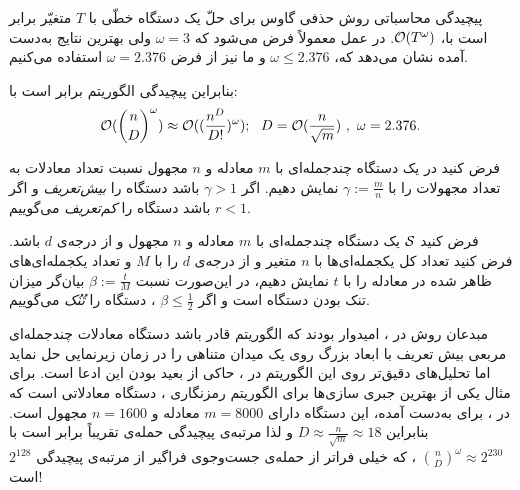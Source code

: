  \begin{remark}
 	پیچیدگی محاسباتی روش حذفی گاوس برای حلّ یک دستگاه خطّی با 
 	$T$
 	متغیّر برابر است با،
 	${\mathcal O}(T^{\omega})$.
 	در عمل معمولاً فرض می‌شود که 
 	$\omega = 3$
 	ولی بهترین نتایج به‌دست  آمده نشان می‌دهد که،
 	$\omega \leq 2.376$
 	و ما نیز از فرض 
 	$\omega = 2.376$
 	استفاده می‌کنیم. 
 \end{remark}
بنابراین پیچیدگی الگوریتم 
برابر است با:
$$\mO(\binom{n}{D}^{\omega}) \approx \mO( (\frac{n^{D}}{D!})^{\omega}); \  \  D = \mO(\frac{n}{\sqrt{m}}) \ , \ \omega = 2.376.$$

\begin{definition}
فرض کنید در یک دستگاه چندجمله‌ای با 
$m$
معادله و 
$n$
مجهول نسبت تعداد معادلات به تعداد مجهولات را با 
$\gamma :=\frac{m}{n}$
نمایش دهیم. اگر 
$\gamma > 1$
باشد دستگاه را 
\textit{بیش‌تعریف}
و اگر 
$r < 1$
باشد دستگاه را 
\textit{کم‌تعریف}
می‌گوییم. 
\end{definition}

\begin{definition}
فرض کنید 
${\mathcal S}$
یک دستگاه چندجمله‌ای با 
$m$
معادله و 
$n$
مجهول و از درجه‌ی 
$d$
باشد. فرض کنید تعداد کل یکجمله‌ای‌ها با 
$n$
متغیر و از درجه‌ی 
$d$
را با 
$M$
و تعداد یکجمله‌ای‌های ظاهر شده در معادله را با 
$t$
نمایش‌ دهیم، در این‌صورت نسبت 
$\beta := \frac{t}{M}$
بیان‌گر میزان تنک بودن دستگاه است و اگر 
$\beta \leq \frac{1}{2}$
، دستگاه را 
\textit{تُنُک}
 می‌گوییم.
\end{definition}

مبدعان روش 
در 
\cite{courtois2000efficient}، 
امیدوار بودند که الگوریتم 
قادر باشد دستگاه معادلات چندجمله‌ای مربعی بیش تعریف با ابعاد بزرگ روی یک میدان متناهی را در زمان زیرنمایی حل نماید اما تحلیل‌های دقیق‌تر روی این الگوریتم در
\cite{courtois2000efficient, diem2004xl}،
حاکی از بعید بودن این ادعا است.  برای مثال  یکی از بهترین جبری سازی‌ها برای الگوریتم رمزنگاری 
، دستگاه معادلاتی است که در 
\cite{courtois2002cryptanalysis}،
برای 
به‌دست  آمده، این دستگاه  دارای 
$m = 8000$
معادله و 
$n = 1600$
مجهول است. بنابراین 
$D\approx \frac{n}{\sqrt{m}}\approx 18$
و لذا مرتبه‌ی پیچیدگی حمله‌ی 
تقریباً برابر است با
$\binom{n}{D}^{\omega}\approx 2^{230}$
، که  خیلی فراتر از حمله‌ی جست‌وجوی فراگیر از مرتبه‌ی پیچیدگی 
$2^{128}$
است! 

